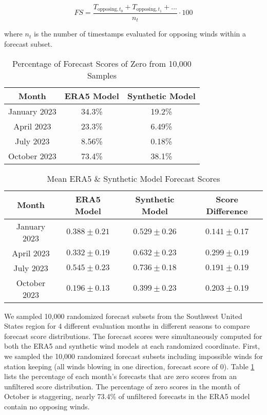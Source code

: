 \begin{equation}\label{forecastScoreEquation}
FS = \frac{T_{\mathrm{opposing},t_0} + T_{\mathrm{opposing},t_1} + \mathrm{...}}{n_t}\cdot 100
\end{equation}

where $n_t$ is the number of timestamps evaluated for opposing winds within a forecast subset. 

\begin{table}[h]
\renewcommand{\arraystretch}{1.3}
\caption{Percentage of Forecast Scores of Zero from 10,000 Samples}
\centering
\begin{tabular}{|c|c|c|}
\hline
\bfseries Month & \bfseries ERA5 Model & \bfseries Synthetic Model \\
\hline%
January 2023 & 34.3\% & 19.2\% \\
April 2023 & 23.3\% & 6.49\%\\
July 2023 & 8.56\% & 0.18\%\\
October 2023 & 73.4\% & 38.1\%\\
\hline
\end{tabular}
\label{tab:zeroFSScores}
\end{table}

\begin{table*}[!t]
\renewcommand{\arraystretch}{1.3}
\caption{Mean ERA5 \& Synthetic Model Forecast Scores}
\centering
\begin{tabular}{|c|c|c|c|}
\hline
\bfseries Month & \bfseries ERA5 Model & \bfseries Synthetic Model  & \bfseries Score Difference\\
\hline%
January 2023 & $0.388 \pm 0.21$ & $0.529 \pm 0.26$ & $0.141 \pm 0.17$ \\
April 2023 & $0.332 \pm 0.19$ & $0.632 \pm 0.23$ & $0.299 \pm 0.19$\\
July 2023 & $0.545 \pm 0.23$ & $0.736 \pm 0.18$ & $0.191 \pm 0.19$\\
October 2023 & $0.196 \pm 0.13$ & $0.399 \pm 0.23$ & $0.203 \pm 0.19$\\
\hline
\end{tabular}
\label{tab:FSDistributionMean}
\end{table*}


We sampled 10,000 randomized forecast subsets from the Southwest United States region for 4 different evaluation months in different seasons to compare forecast score distributions. The forecast scores were simultaneously computed for both the ERA5 and synthetic wind models at each randomized coordinate. First, we sampled the 10,000 randomized forecast subsets including impossible winds for station keeping (all winds blowing in one direction, forecast score of 0).
Table \ref{tab:zeroFSScores} lists the percentage of each month's forecasts that are zero scores from an unfiltered score distribution.  The percentage of zero scores in the month of October is staggering, nearly 73.4\% of unfiltered forecasts in the ERA5 model contain no opposing winds.  


